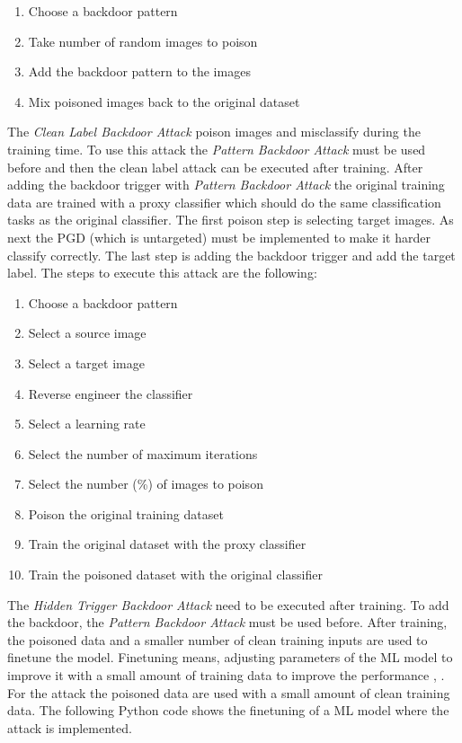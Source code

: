 \begin{enumerate}
  \item Choose a backdoor pattern
  \item Take number of random images to poison
  \item Add the backdoor pattern to the images
  \item Mix poisoned images back to the original dataset
\end{enumerate}

The \textit{Clean Label Backdoor Attack} \cite{turner2018clean} poison images and misclassify during the training time. To use this attack the \textit{Pattern Backdoor Attack} must be
used before and then the clean label attack can be executed after training. After adding the backdoor trigger with \textit{Pattern Backdoor Attack} the original training data are trained
with a proxy classifier which should do the same classification tasks as the original classifier. The first poison step is selecting target images. As next the PGD (which is untargeted)
must be implemented to make it harder classify correctly. The last step is adding the backdoor trigger and add the target label. The steps to execute this attack are the following: \\

\begin{enumerate}
  \item Choose a backdoor pattern
  \item Select a source image
  \item Select a target image
  \item Reverse engineer the classifier
  \item Select a learning rate
  \item Select the number of maximum iterations
  \item Select the number (\%) of images to poison
  \item Poison the original training dataset
  \item Train the original dataset with the proxy classifier
  \item Train the poisoned dataset with the original classifier
\end{enumerate}

The \textit{Hidden Trigger Backdoor Attack} \cite{DBLP:journals/corr/abs-1910-00033} need to be executed after training. To add the backdoor, the \textit{Pattern Backdoor Attack} must be
used before. After training, the poisoned data and a smaller number of clean training inputs are used to finetune the model. Finetuning means, adjusting parameters of the ML model to
improve it with a small amount of training data to improve the performance \cite{DBLP:conf/acl/LiWTTTPBCA20}, \cite{DBLP:journals/corr/abs-2112-08691}. For the attack the poisoned data
are used with a small amount of clean training data. The following Python code shows the finetuning of a ML model where the attack is implemented.

